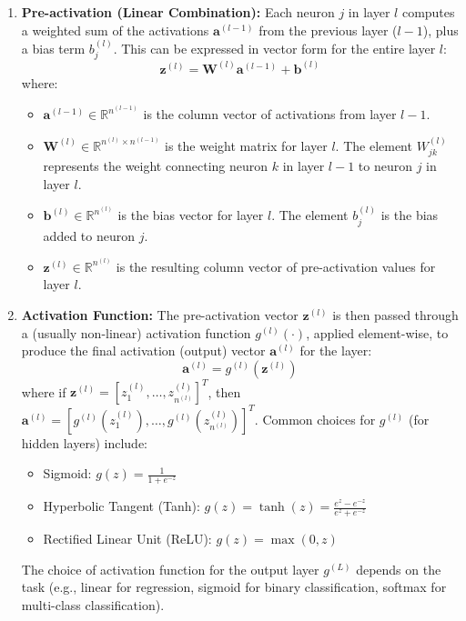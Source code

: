 \documentclass[11pt,twoside,openright]{report}
\begin{document}
\begin{enumerate}
    \item \textbf{Pre-activation (Linear Combination):} Each neuron $j$ in layer $l$ computes a weighted sum of the activations $\mathbf{a}^{(l-1)}$ from the previous layer ($l-1$), plus a bias term $b_j^{(l)}$. This can be expressed in vector form for the entire layer $l$:
        \begin{equation} \label{eq:preactivation}
            \mathbf{z}^{(l)} = \mathbf{W}^{(l)} \mathbf{a}^{(l-1)} + \mathbf{b}^{(l)}
        \end{equation}
        where:
        \begin{itemize}
            \item $\mathbf{a}^{(l-1)} \in \mathbb{R}^{n^{(l-1)}}$ is the column vector of activations from layer $l-1$.
            \item $\mathbf{W}^{(l)} \in \mathbb{R}^{n^{(l)} \times n^{(l-1)}}$ is the weight matrix for layer $l$. The element $W_{jk}^{(l)}$ represents the weight connecting neuron $k$ in layer $l-1$ to neuron $j$ in layer $l$.
            \item $\mathbf{b}^{(l)} \in \mathbb{R}^{n^{(l)}}$ is the bias vector for layer $l$. The element $b_j^{(l)}$ is the bias added to neuron $j$.
            \item $\mathbf{z}^{(l)} \in \mathbb{R}^{n^{(l)}}$ is the resulting column vector of pre-activation values for layer $l$.
        \end{itemize}

    \item \textbf{Activation Function:} The pre-activation vector $\mathbf{z}^{(l)}$ is then passed through a (usually non-linear) activation function $g^{(l)}(\cdot)$, applied element-wise, to produce the final activation (output) vector $\mathbf{a}^{(l)}$ for the layer:
        \begin{equation} \label{eq:activation}
            \mathbf{a}^{(l)} = g^{(l)}(\mathbf{z}^{(l)})
        \end{equation}
        where if $\mathbf{z}^{(l)} = [z_1^{(l)}, \dots, z_{n^{(l)}}^{(l)}]^T$, then $\mathbf{a}^{(l)} = [g^{(l)}(z_1^{(l)}), \dots, g^{(l)}(z_{n^{(l)}}^{(l)})]^T$. Common choices for $g^{(l)}$ (for hidden layers) include:
        \begin{itemize}
            \item Sigmoid: $g(z) = \frac{1}{1 + e^{-z}}$
            \item Hyperbolic Tangent (Tanh): $g(z) = \tanh(z) = \frac{e^z - e^{-z}}{e^z + e^{-z}}$
            \item Rectified Linear Unit (ReLU): $g(z) = \max(0, z)$
        \end{itemize}
        The choice of activation function for the output layer $g^{(L)}$ depends on the task (e.g., linear for regression, sigmoid for binary classification, softmax for multi-class classification).
\end{enumerate}
\end{document}
